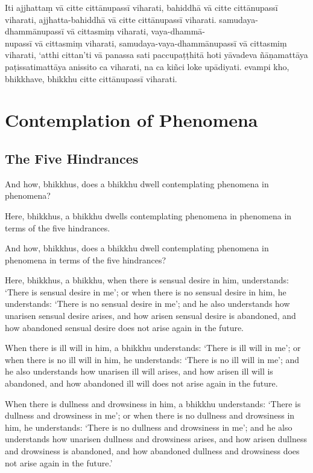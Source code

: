 Iti ajjhattaṃ vā citte cittānupassī viharati, bahiddhā vā citte cittānupassī
viharati, ajjhatta-bahiddhā vā citte cittānupassī viharati.
samudaya-dhammānupassī vā cittasmiṃ viharati, vaya-dhammā-\\
nupassī vā cittasmiṃ viharati, samudaya-vaya-dhammānupassī vā cittasmiṃ
viharati, ‘atthi cittan’ti vā panassa sati paccupaṭṭhitā hoti yāvadeva
ñāṇamattāya paṭissatimattāya anissito ca viharati, na ca kiñci loke upādiyati.
evampi kho, bhikkhave, bhikkhu citte cittānupassī viharati.


\englishPage

\paliPage

\englishPage
\chapter{Contemplation of Phenomena}

\section{The Five Hindrances}

And how, bhikkhus, does a bhikkhu dwell contemplating phenomena in phenomena?

Here, bhikkhus, a bhikkhu dwells contemplating phenomena in phenomena in terms
of the five hindrances.

And how, bhikkhus, does a bhikkhu dwell contemplating phenomena in phenomena in
terms of the five hindrances?

Here, bhikkhus, a bhikkhu,
when there is sensual desire in him, understands:
`There is sensual desire in me';
or when there is no sensual desire in him, he understands:
`There is no sensual desire in me';
and he also understands how unarisen sensual desire arises,
and how arisen sensual desire is abandoned,
and how abandoned sensual desire does not arise again in the future.

When there is ill will in him, a bhikkhu understands:
`There is ill will in me';
or when there is no ill will in him, he understands:
`There is no ill will in me';
and he also understands how unarisen ill will arises,
and how arisen ill will is abandoned,
and how abandoned ill will does not arise again in the future.

When there is dullness and drowsiness in him, a bhikkhu understands:
`There is dullness and drowsiness in me';
or when there is no dullness and drowsiness in him, he understands:
`There is no dullness and drowsiness in me';
and he also understands how unarisen dullness and drowsiness arises,
and how arisen dullness and drowsiness is abandoned, and
how abandoned dullness and drowsiness does not arise again in the future.'

